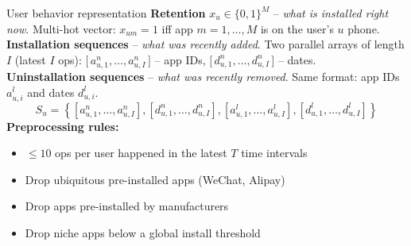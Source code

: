 \documentclass[aspectratio=169,t]{beamer}
\begin{document}
\begin{frame}{User behavior representation}
    \textbf{Retention} $x_u \in \{0,1\}^M$ -- \emph{what is installed right now}.
    Multi-hot vector: $x_{um} = 1$ iff app $m = 1, \ldots, M$ is on the user's $u$ phone.\\[0.2cm]
    \textbf{Installation sequences} -- \emph{what was recently added}.
    Two parallel arrays of length $I$ (latest $I$ ops):
    $\bigl[\,a^n_{u,1},\ldots,a^n_{u,I}\,\bigr]$ -- app IDs,\;
    $\bigl[\,d^n_{u,1},\ldots,d^n_{u,I}\,\bigr]$ -- dates.\\[0.2cm]
    \textbf{Uninstallation sequences} -- \emph{what was recently removed}.
    Same format: app IDs $a^l_{u,i}$ and dates $d^l_{u,i}$.\\[0.2cm]
    $$S_u = \left\{[a^n_{u,1},\ldots,a^n_{u,I}],[d^n_{u,1},\ldots,d^n_{u,I}],[a^l_{u,1},\ldots,a^l_{u,I}],[d^l_{u,1},\ldots,d^l_{u,I}]\right\}$$
    \textbf{Preprocessing rules:}
    \begin{itemize}
    \item $\leq 10$ ops per user happened in the latest $T$ time intervals
    \item Drop ubiquitous pre-installed apps (WeChat, Alipay)
    \item Drop apps pre-installed by manufacturers
    \item Drop niche apps below a global install threshold
    \end{itemize}
\end{frame}
\end{document}
